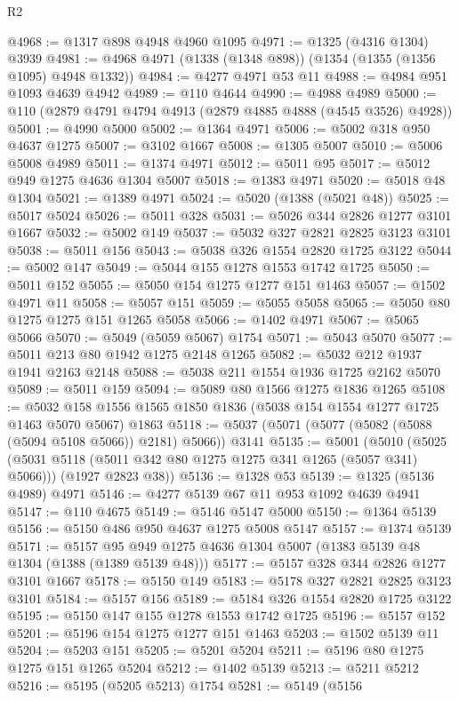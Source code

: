 \begin{lexlean}{R2}
\begin{coremodule}
@4968 := @1317 @898 @4948 @4960 @1095
@4971 := @1325 (@4316 @1304) @3939
@4981 := @4968 @4971 (@1338 (@1348 @898)) (@1354 (@1355 (@1356 @1095) @4948 @1332))
@4984 := @4277 @4971 @53 @11
@4988 := @4984 @951 @1093 @4639 @4942
@4989 := @110 @4644
@4990 := @4988 @4989
@5000 := @110 (@2879 @4791 @4794 @4913 (@2879 @4885 @4888 (@4545 @3526) @4928))
@5001 := @4990 @5000
@5002 := @1364 @4971
@5006 := @5002 @318 @950 @4637 @1275
@5007 := @3102 @1667
@5008 := @1305 @5007
@5010 := @5006 @5008 @4989
@5011 := @1374 @4971
@5012 := @5011 @95
@5017 := @5012 @949 @1275 @4636 @1304 @5007
@5018 := @1383 @4971
@5020 := @5018 @48 @1304
@5021 := @1389 @4971
@5024 := @5020 (@1388 (@5021 @48))
@5025 := @5017 @5024
@5026 := @5011 @328
@5031 := @5026 @344 @2826 @1277 @3101 @1667
@5032 := @5002 @149
@5037 := @5032 @327 @2821 @2825 @3123 @3101
@5038 := @5011 @156
@5043 := @5038 @326 @1554 @2820 @1725 @3122
@5044 := @5002 @147
@5049 := @5044 @155 @1278 @1553 @1742 @1725
@5050 := @5011 @152
@5055 := @5050 @154 @1275 @1277 @151 @1463
@5057 := @1502 @4971 @11
@5058 := @5057 @151
@5059 := @5055 @5058
@5065 := @5050 @80 @1275 @1275 @151 @1265 @5058
@5066 := @1402 @4971
@5067 := @5065 @5066
@5070 := @5049 (@5059 @5067) @1754
@5071 := @5043 @5070
@5077 := @5011 @213 @80 @1942 @1275 @2148 @1265
@5082 := @5032 @212 @1937 @1941 @2163 @2148
@5088 := @5038 @211 @1554 @1936 @1725 @2162 @5070
@5089 := @5011 @159
@5094 := @5089 @80 @1566 @1275 @1836 @1265
@5108 := @5032 @158 @1556 @1565 @1850 @1836 (@5038 @154 @1554 @1277 @1725 @1463 @5070 @5067) @1863
@5118 := @5037 (@5071 (@5077 (@5082 (@5088 (@5094 @5108 @5066)) @2181) @5066)) @3141
@5135 := @5001
    (@5010
      (@5025 (@5031 @5118 (@5011 @342 @80 @1275 @1275 @341 @1265 (@5057 @341) @5066)))
      (@1927 @2823 @38))
@5136 := @1328 @53
@5139 := @1325 (@5136 @4989) @4971
@5146 := @4277 @5139 @67 @11 @953 @1092 @4639 @4941
@5147 := @110 @4675
@5149 := @5146 @5147 @5000
@5150 := @1364 @5139
@5156 := @5150 @486 @950 @4637 @1275 @5008 @5147
@5157 := @1374 @5139
@5171 := @5157 @95 @949 @1275 @4636 @1304 @5007 (@1383 @5139 @48 @1304 (@1388 (@1389 @5139 @48)))
@5177 := @5157 @328 @344 @2826 @1277 @3101 @1667
@5178 := @5150 @149
@5183 := @5178 @327 @2821 @2825 @3123 @3101
@5184 := @5157 @156
@5189 := @5184 @326 @1554 @2820 @1725 @3122
@5195 := @5150 @147 @155 @1278 @1553 @1742 @1725
@5196 := @5157 @152
@5201 := @5196 @154 @1275 @1277 @151 @1463
@5203 := @1502 @5139 @11
@5204 := @5203 @151
@5205 := @5201 @5204
@5211 := @5196 @80 @1275 @1275 @151 @1265 @5204
@5212 := @1402 @5139
@5213 := @5211 @5212
@5216 := @5195 (@5205 @5213) @1754
@5281 := @5149
    (@5156

\end{coremodule}
\end{lexlean}
